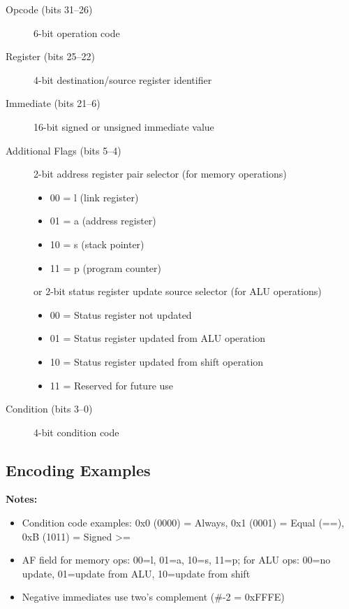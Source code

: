 \begin{description}
	\item[Opcode (bits 31--26)] 6-bit operation code
	\item[Register (bits 25--22)] 4-bit destination/source register identifier
	\item[Immediate (bits 21--6)] 16-bit signed or unsigned immediate value
	\item[Additional Flags (bits 5--4)] 2-bit address register pair selector (for memory operations)
	      \begin{itemize}
		      \item 00 = l (link register)
		      \item 01 = a (address register)
		      \item 10 = s (stack pointer)
		      \item 11 = p (program counter)
	      \end{itemize}
	      or 2-bit status register update source selector (for ALU operations)
	      \begin{itemize}
		      \item 00 = Status register not updated
		      \item 01 = Status register updated from ALU operation
		      \item 10 = Status register updated from shift operation
		      \item 11 = Reserved for future use
	      \end{itemize}
	\item[Condition (bits 3--0)] 4-bit condition code
\end{description}

\subsection{Encoding Examples}



\noindent\textbf{Notes:}
\begin{itemize}
	\item Condition code examples: 0x0 (0000) = Always, 0x1 (0001) = Equal (==), 0xB (1011) = Signed >=
	\item AF field for memory ops: 00=l, 01=a, 10=s, 11=p; for ALU ops: 00=no update, 01=update from ALU, 10=update from shift
	\item Negative immediates use two's complement (\#-2 = 0xFFFE)
\end{itemize}

